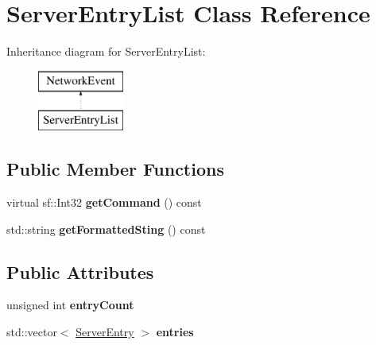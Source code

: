 \hypertarget{class_server_entry_list}{\section{Server\-Entry\-List Class Reference}
\label{class_server_entry_list}
}
Inheritance diagram for Server\-Entry\-List\-:\begin{figure}[H]
\begin{center}
\leavevmode
\includegraphics[height=2.000000cm]{class_server_entry_list}
\end{center}
\end{figure}
\subsection*{Public Member Functions}
\begin{DoxyCompactItemize}
\item 
\hypertarget{class_server_entry_list_a1de6a684d051455cb01b5a7463450174}{virtual sf\-::\-Int32 {\bfseries get\-Command} () const }\label{class_server_entry_list_a1de6a684d051455cb01b5a7463450174}

\item 
\hypertarget{class_server_entry_list_a80512f44909663185973ca5492b9a261}{std\-::string {\bfseries get\-Formatted\-Sting} () const }\label{class_server_entry_list_a80512f44909663185973ca5492b9a261}

\end{DoxyCompactItemize}
\subsection*{Public Attributes}
\begin{DoxyCompactItemize}
\item 
\hypertarget{class_server_entry_list_a52397a6ee52b4126c05c894cd7909ab5}{unsigned int {\bfseries entry\-Count}}\label{class_server_entry_list_a52397a6ee52b4126c05c894cd7909ab5}

\item 
\hypertarget{class_server_entry_list_aeddfb1725e3da990489a6687656e85f0}{std\-::vector$<$ \hyperlink{class_server_entry}{Server\-Entry} $>$ {\bfseries entries}}\label{class_server_entry_list_aeddfb1725e3da990489a6687656e85f0}

\end{DoxyCompactItemize}
